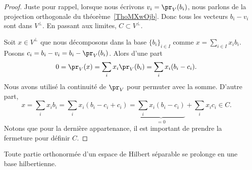 \begin{proof}
    Juste pour rappel, lorsque nous écrivons \( v_i=\pr_V(b_i)\), nous parlons de la projection orthogonale du théorème~\ref{ThoMXwOjb}. Donc tous les vecteurs \( b_i-v_i\) sont dans \( V^{\perp}\). En passant aux limites, \( C\subset V^{\perp}\).

    Soit \( x\in V^{\perp}\) que nous décomposons dans la base \( \{ b_i \}_{i\in I}\) comme \( x=\sum_{i\in I}x_ib_i\). Posons \( c_i=b_i-v_i=b_i-\pr_V(b_i)\). Alors d'une part
    \begin{equation}
        0=\pr_V(x)=\sum_ix_i\pr_V(b_i)=\sum_ix_i(b_i-c_i).
    \end{equation}
    Nous avons utilisé la continuité de \( \pr_V\) pour permuter avec la somme. D'autre part,
    \begin{equation}
        x=\sum_ix_ib_i=\sum_ix_i(b_i-c_i+c_i)=\underbrace{\sum_ix_i(b_i-c_i)}_{=0}+\sum_ix_ic_i\in C.
    \end{equation}
    Notons que pour la dernière appartenance, il est important de prendre la fermeture pour définir \( C\).
\end{proof}

\begin{proposition}
    Toute partie orthonormée d'un espace de Hilbert séparable se prolonge en une base hilbertienne.
\end{proposition}

